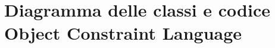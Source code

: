 \section{Diagramma delle classi e codice Object Constraint Language}
\label{secD3:DiagrammaECodiceObjectConstraintLanguage}
